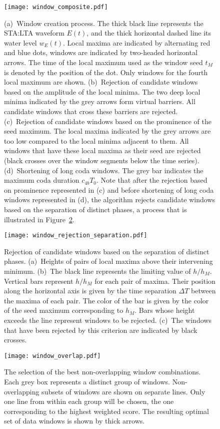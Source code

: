 \begin{figure}
\center \texttt{[image: window\_composite.pdf]}
\caption{\label{fg:win_composite}
(a)~Window creation process.  The thick black line represents the STA:LTA
waveform $E(t)$, and the thick horizontal dashed line its water level $w_E(t)$.
Local maxima are indicated by alternating red and blue dots, windows are
indicated by two-headed horizontal arrows.  The time of the local maximum used
as the window seed $t_M$ is denoted by the position of the dot. Only windows for the fourth local maximum are shown.  (b)~Rejection of candidate windows based on the amplitude of the local minima.  The two deep
local minima indicated by the grey arrows form virtual barriers. All candidate
windows that cross these barriers are rejected.
(c)~Rejection of candidate
windows based on the prominence of the seed maximum.  The local maxima
indicated by the grey arrows are too low compared to the local minima
adjacent to them.  All windows that have these local maxima as their seed are
rejected (black crosses over the window segments below the time series).
(d)~Shortening of long coda windows.  The grey bar indicates the maximum coda
duration $c_{4b} T_0$.  Note that after the rejection based on prominence represented in (c) and before shortening of long coda windows represented in (d), the algorithm rejects candidate windows based on the separation of distinct phases, a process that is illustrated in Figure~\ref{fg:separation}.
}
\end{figure}

\begin{figure}
\center \texttt{[image: window\_rejection\_separation.pdf]}
\caption{\label{fg:separation}
Rejection of candidate windows based on the separation of distinct phases.
(a)~Heights of pairs of local maxima above their intervening minimum.
(b)~The black line represents the limiting value of $h/h_M$.  Vertical bars represent
$h/h_M$ for each pair of maxima.  Their position along the horizontal axis is
given by the time separation $\Delta T$ between the maxima of each pair.  The
color of the bar is given by the color of the seed maximum corresponding to $h_M$.  Bars whose height
exceeds the line represent windows to be rejected.
(c)~The windows that have been rejected by this criterion are indicated by black
crosses.
}
\end{figure}

\begin{figure}
\center \texttt{[image: window\_overlap.pdf]}
\caption{\label{fg:phaseD}
The selection of the best non-overlapping window
combinations.  Each grey box represents a distinct group of windows.
Non-overlapping subsets of windows are shown on separate lines.  Only one
line from within each group will be chosen, the one corresponding to the
highest weighted score.  The resulting optimal set
of data windows is shown by thick arrows.}
\end{figure}

